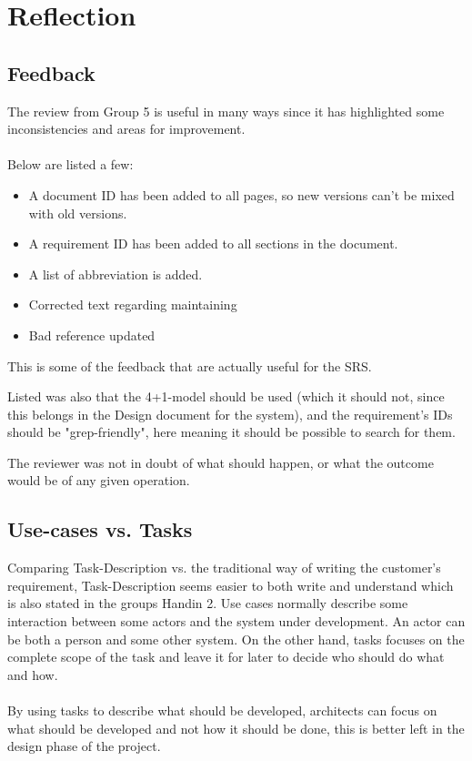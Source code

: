 \documentclass[Main]{subfiles}
\begin{document}
\chapter{Reflection}

\section{Feedback}

The review from Group 5 is useful in many ways since it has highlighted some inconsistencies and areas for improvement.
\\
\\
Below are listed a few:

\begin{itemize}

\item A document ID has been added to all pages, so new versions can't be mixed with old versions.

\item A requirement ID has been added to all sections in the document.

\item A list of abbreviation is added.

\item Corrected text regarding maintaining

\item Bad reference updated 

\end{itemize}
This is some of the feedback that are actually useful for the SRS.

Listed was also that the 4+1-model should be used (which it should not, since this belongs in the Design document for the system), and the requirement's IDs should be "grep-friendly", here meaning it should be possible to search for them.

The reviewer was not in doubt of what should happen, or what the outcome would be of any given operation.



\section{Use-cases vs. Tasks}

Comparing Task-Description vs. the traditional way of writing the customer's requirement, Task-Description seems easier to both write and understand which is also stated in the groups Handin 2\cite[p. 2]{HI2}.
Use cases normally describe some interaction between some actors and the system under development.
An actor can be both a person and some other system.
On the other hand, tasks focuses on the complete scope of the task and leave it for later to decide who should do what and how\cite[p. 3]{HI2}.
\\
\\
By using tasks to describe what should be developed, architects can focus on what should be developed and not how it should be done, this is better left in the design phase of the project.
\end{document}
